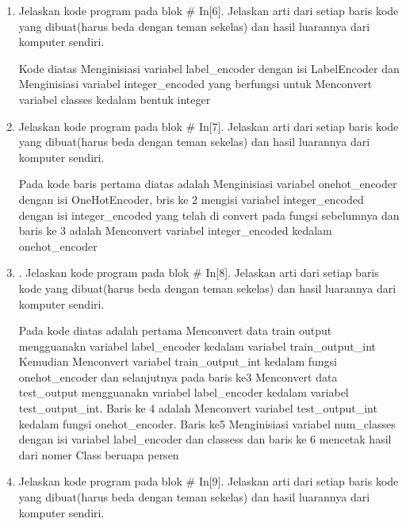 \begin{enumerate}
\item Jelaskan kode program pada blok \# In[6]. Jelaskan arti dari setiap baris kode
yang dibuat(harus beda dengan teman sekelas) dan hasil luarannya dari komputer sendiri.

	\hfill\break
	
	
Kode diatas Menginisiasi variabel label_encoder dengan isi LabelEncoder dan Menginisiasi variabel integer\_encoded yang berfungsi untuk Menconvert variabel classes kedalam bentuk integer

\item Jelaskan kode program pada blok \# In[7]. Jelaskan arti dari setiap baris kode
yang dibuat(harus beda dengan teman sekelas) dan hasil luarannya dari komputer sendiri.

	\hfill\break
	

Pada kode baris pertama diatas adalah Menginisiasi variabel onehot_encoder dengan isi OneHotEncoder, bris ke 2 mengisi variabel integer_encoded dengan isi integer_encoded yang telah di convert pada fungsi sebelumnya dan baris ke 3 adalah  Menconvert variabel integer_encoded kedalam onehot_encoder


\item . Jelaskan kode program pada blok \# In[8]. Jelaskan arti dari setiap baris kode
yang dibuat(harus beda dengan teman sekelas) dan hasil luarannya dari komputer sendiri.
	
	\hfill\break
	

Pada kode diatas adalah pertama Menconvert data train output  mengguanakn variabel label\_encoder kedalam variabel train\_output\_int\\
Kemudian Menconvert variabel train\_output\_int kedalam fungsi onehot\_encoder dan selanjutnya pada baris ke3 Menconvert data test_output mengguanakn variabel label_encoder kedalam variabel test_output_int. Baris ke 4 adalah Menconvert variabel test_output_int kedalam fungsi onehot_encoder. Baris ke5 Menginisiasi variabel num_classes dengan isi variabel label_encoder dan classess dan baris ke 6 mencetak hasil dari nomer Class beruapa persen 

\item Jelaskan kode program pada blok \# In[9]. Jelaskan arti dari setiap baris kode
yang dibuat(harus beda dengan teman sekelas) dan hasil luarannya dari komputer sendiri.


\end{enumerate}
